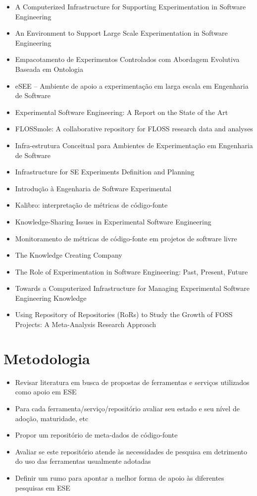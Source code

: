 \documentclass[12pt]{article}
\begin{document}
\begin{itemize}
\item A Computerized Infrastructure for Supporting Experimentation in Software Engineering
\item An Environment to Support Large Scale Experimentation in Software Engineering
\item Empacotamento de Experimentos Controlados com Abordagem Evolutiva Baseada em Ontologia
\item eSEE – Ambiente de apoio a experimentação em larga escala em Engenharia de Software
\item Experimental Software Engineering: A Report on the State of the Art
\item FLOSSmole: A collaborative repository for FLOSS research data and analyses
\item Infra-estrutura Conceitual para Ambientes de Experimentação em Engenharia de Software
\item Infrastructure for SE Experiments Definition and Planning
\item Introdução à Engenharia de Software Experimental
\item Kalibro: interpretação de métricas de código-fonte
\item Knowledge-Sharing Issues in Experimental Software Engineering
\item Monitoramento de métricas de código-fonte em projetos de software livre
\item The Knowledge Creating Company
\item The Role of Experimentation in Software Engineering: Past, Present, Future
\item Towards a Computerized Infrastructure for Managing Experimental Software Engineering Knowledge
\item Using Repository of Repositories (RoRs) to Study the Growth of FOSS Projects: A Meta-Analysis Research Approach
\end{itemize}

\section{Metodologia}

\begin{itemize}
\item Revisar literatura em busca de propostas de ferramentas e serviços utilizados como apoio em ESE
\item Para cada ferramenta/serviço/repositório avaliar seu estado e seu nível de adoção, maturidade, etc
\item Propor um repositório de meta-dados de código-fonte
\item Avaliar se este repositório atende às necessidades de pesquisa em detrimento do uso das ferramentas usualmente adotadas
\item Definir um rumo para apontar a melhor forma de apoio às diferentes pesquisas em ESE
\end{itemize}
\end{document}
